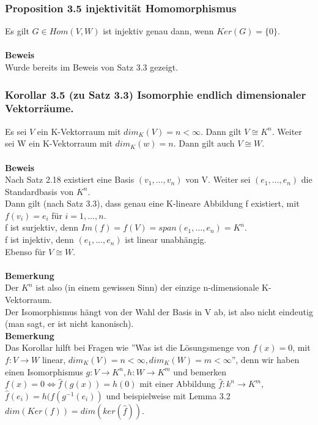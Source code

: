 \documentclass{scrartcl}
\begin{document}
\subsubsection{Proposition 3.5 injektivit\"at Homomorphismus}
Es gilt \(G \in Hom(V, W)\) ist injektiv genau dann, wenn \(Ker(G) = \{0\}\).\\
\\
\textbf{Beweis}\\
Wurde bereits im Beweis von Satz 3.3 gezeigt.

\subsubsection{Korollar 3.5 (zu Satz 3.3) Isomorphie endlich dimensionaler Vektorr\"aume.}
Es sei \(V\) ein K-Vektorraum mit \(dim_K(V) = n < \infty\). Dann gilt \(V \cong K^n\). Weiter sei W ein K-Vektorraum mit \(dim_K(w) = n\). Dann gilt auch \(V \cong W\).\\
\\
\textbf{Beweis}\\
Nach Satz 2.18 existiert eine Basis \((v_1, \dots, v_n)\) von V. Weiter sei \((e_1, \dots, e_n)\) die Standardbasis von \(K^n\).\\
Dann gilt (nach Satz 3.3), dass genau eine K-lineare Abbildung f existiert, mit \(f(v_i) = e_i\) f\"ur \(i = 1, \dots, n\).\\
f ist surjektiv, denn  \(Im(f) = f(V) = span(e_1, \dots, e_n) = K^n\).\\
f ist injektiv, denn \((e_1, \dots, e_n)\) ist linear unabh\"angig.\\
Ebenso f\"ur \(V \cong W\).\\
\\
\textbf{Bemerkung}\\
Der \(K^n\) ist also (in einem gewissen Sinn) der einzige n-dimensionale K-Vektorraum.\\
Der Isomorphismus h\"angt von der Wahl der Basis in V ab, ist also nicht eindeutig (man sagt, er ist nicht kanonisch).\\
\textbf{Bemerkung}\\
Das Korollar hilft bei Fragen wie ''Was ist die L\"osungsmenge von \(f(x) = 0\), mit \(f : V \to W\) linear, \(dim_K(V) = n < \infty, dim_K(W) = m < \infty\)'', denn wir haben einen Isomorphismus \(g : V \to K^n, h : W \to K^m\) und bemerken \(f(x) = 0 \Leftrightarrow \hat{f}(g(x)) = h(0)\) mit einer Abbildung \(\hat{f} : k^n \to K^m\), \(\hat{f}(e_i) = h(f(g^{-1}(e_i))\) und beispielweise mit Lemma 3.2 \(dim(Ker(f)) = dim(ker(\hat{f}))\). 
\end{document}
